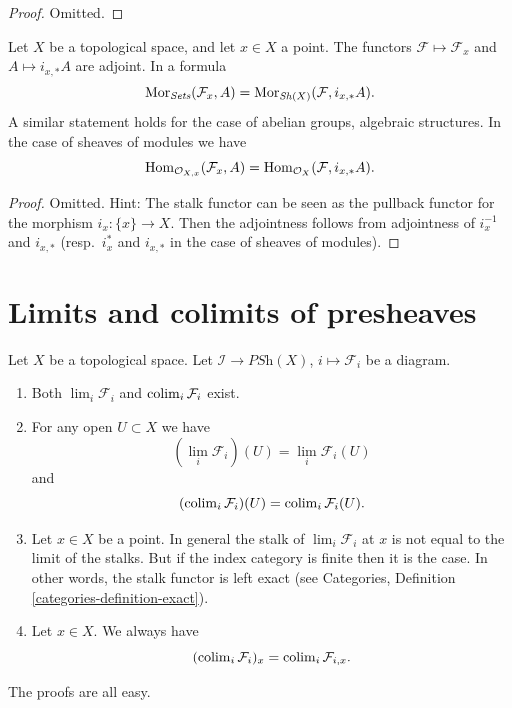 \begin{proof}
Omitted.
\end{proof}

\begin{lemma}
\label{lemma-stalk-skyscraper-adjoint}
Let $X$ be a topological space, and let $x \in X$ a point.
The functors $\mathcal{F} \mapsto \mathcal{F}_x$ and
$A \mapsto i_{x, *}A$ are adjoint. In a formula
$$
\mathop{\mathrm{Mor}}\nolimits_{\textit{Sets}}(\mathcal{F}_x, A)
=
\mathop{\mathrm{Mor}}\nolimits_{\mathop{\mathit{Sh}}\nolimits(X)}(\mathcal{F}, i_{x, *}A).
$$
A similar statement holds for the case of
abelian groups, algebraic structures. In the case of
sheaves of modules we have
$$
\mathop{\mathrm{Hom}}\nolimits_{\mathcal{O}_{X, x}}(\mathcal{F}_x, A)
=
\mathop{\mathrm{Hom}}\nolimits_{\mathcal{O}_X}(\mathcal{F}, i_{x, *}A).
$$
\end{lemma}

\begin{proof}
Omitted. Hint: The stalk functor can be
seen as the pullback functor for the morphism $i_x : \{x\} \to X$.
Then the adjointness follows from adjointness of
$i_x^{-1}$ and $i_{x, *}$ (resp.\ $i_x^*$ and $i_{x, *}$
in the case of sheaves of modules).
\end{proof}









\section{Limits and colimits of presheaves}
\label{section-limits-presheaves}

\noindent
Let $X$ be a topological space.
Let $\mathcal{I} \to \textit{PSh}(X)$, $i \mapsto \mathcal{F}_i$
be a diagram.
\begin{enumerate}
\item Both $\lim_i \mathcal{F}_i$ and $\mathop{\mathrm{colim}}\nolimits_i \mathcal{F}_i$
exist.
\item For any open $U \subset X$ we have
$$
(\lim_i \mathcal{F}_i)(U) =
\lim_i \mathcal{F}_i(U)
$$
and
$$
(\mathop{\mathrm{colim}}\nolimits_i \mathcal{F}_i)(U) =
\mathop{\mathrm{colim}}\nolimits_i \mathcal{F}_i(U).
$$
\item Let $x \in X$ be a point. In general the stalk of
$\lim_i \mathcal{F}_i$ at $x$ is not equal to
the limit of the stalks. But if the index category is finite
then it is the case. In other words, the stalk functor is
left exact (see Categories, Definition \ref{categories-definition-exact}).
\item Let $x \in X$. We always have
$$
(\mathop{\mathrm{colim}}\nolimits_i \mathcal{F}_i)_x =
\mathop{\mathrm{colim}}\nolimits_i \mathcal{F}_{i, x}.
$$
\end{enumerate}
The proofs are all easy.

